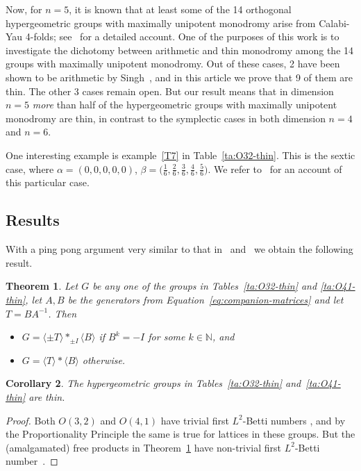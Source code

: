 \documentclass[11pt,a4paper]{amsart}
\newtheorem{thm}{Theorem}
\newtheorem{cor}[thm]{Corollary}
\theoremstyle{definition}
\theoremstyle{definition}
\numberwithin{equation}{section}
\begin{document}
Now, for $n=5$, it is known that at least some of the 14 orthogonal hypergeometric groups with maximally unipotent monodromy arise from Calabi-Yau 4-folds; see~\cite[Sec.~3.9.3]{BKL} for a detailed account. One of the purposes of this work is to investigate the dichotomy between arithmetic and thin monodromy among the 14 groups with maximally unipotent monodromy.
Out of these cases, 2 have been shown to be arithmetic by Singh~\cite{S15O}, and in this article we prove that 9 of them are thin. The other 3 cases remain open. But our result means that in dimension $n=5$ \emph{more} than half of the hypergeometric groups with maximally unipotent monodromy are thin, in contrast to the symplectic cases in both dimension $n=4$ and $n=6$.

One interesting example is example~\ref{T7} in Table~\ref{ta:O32-thin}. This is the sextic case, where $\alpha=\left(0,0,0,0,0\right)$, $\beta=\big(\frac{1}{6},\frac{2}{6},\frac{3}{6},\frac{4}{6},\frac{5}{6}\big)$. We refer to~\cite[Sec.~6]{KP} for an account of this particular case.

\subsection{Results}
With a ping pong argument very similar to that in~\cite{BT} and~\cite{BDN21} we obtain the following result.

\begin{thm}\label{thm:main-result}
Let $G$ be any one of the groups in Tables~\ref{ta:O32-thin} and \ref{ta:O41-thin}, let $A,B$ be the generators from Equation~\ref{eq:companion-matrices} and let $T=BA^{-1}$. Then

\begin{itemize}
\item $G=\langle\pm T\rangle\ast_{\pm I}\langle B\rangle$ if $B^k=-I$ for some $k\in\mathbb{N}$, and
\item $G=\langle T\rangle\ast\langle B\rangle$ otherwise.
\end{itemize}
\end{thm}

\begin{cor}
The hypergeometric groups in Tables~\ref{ta:O32-thin} and~\ref{ta:O41-thin} are thin.
\end{cor}
\begin{proof}
Both $O(3,2)$ and $O(4,1)$ have trivial first $L^2$-Betti numbers \cite[Ex.\ 1.6]{G}, and by the Proportionality Principle \cite[Cor.\ 0.2, Thm.\ 6.3]{G} the same is true for lattices in these groups. But the (amalgamated) free products in Theorem~\ref{thm:main-result} have non-trivial first $L^2$-Betti number~\cite[Thm.\ A.1]{BDJ}.
\end{proof}
\end{document}
